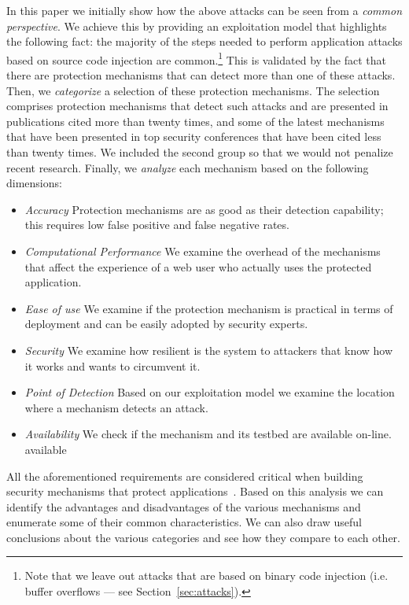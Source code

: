 \documentclass[conference]{IEEEtran}
\begin{document}
In this paper we initially show how the above attacks can be seen from
a {\it common perspective}. We achieve this by providing an
exploitation model that highlights the following fact: the majority of
the steps needed to perform application attacks based on
source code injection are common.\footnote{Note that we leave out
  attacks that are based on binary code injection (i.e. buffer
  overflows --- see Section~\ref{sec:attacks}).} This is validated by
the fact that there are protection mechanisms that can detect more
than one of these attacks. Then, we {\it categorize} a selection of
these protection mechanisms. The selection comprises protection
mechanisms that detect such attacks and are presented in publications
cited more than twenty times, and some of the latest mechanisms that
have been presented in top security conferences that have been cited
less than twenty times. We included the second group so that we would
not penalize recent research. Finally, we {\it analyze} each mechanism based
on the following dimensions:
\begin{itemize}
\item {\it Accuracy} Protection mechanisms are as good
  as their detection capability; this requires low false positive and
  false negative rates.
\item {\it Computational Performance} We examine
  the overhead of the mechanisms
  that affect the experience of a web user who actually
  uses the protected application.
\item {\it Ease of use} We examine if the protection
  mechanism is practical in terms of deployment
  and can be easily adopted by security experts.
\item {\it Security} We examine how resilient is the system to
  attackers that know how it works and wants to circumvent it.
\item {\it Point of Detection} Based on our exploitation model
  we examine the location where a mechanism detects an attack.
\item {\it Availability} We check if the mechanism and its
  testbed are available on-line.
available 
\end{itemize}

\noindent
All the aforementioned requirements are considered critical
when building security mechanisms that protect
applications~\cite{A01,A00,SPWS13,nature2014}.
Based on this analysis we can identify the advantages
and disadvantages of the
various mechanisms and enumerate some of their common
characteristics. We can also draw useful conclusions
about the various categories and see how they compare
to each other.
\end{document}
